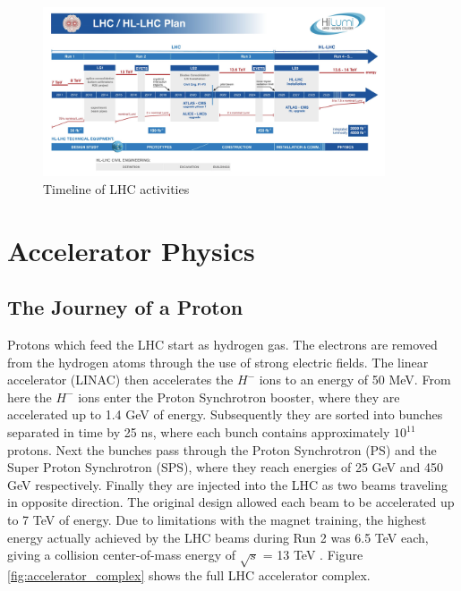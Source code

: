 \begin{figure}
        \centering
	\includegraphics[width=0.9\textwidth]{figures/ch2/hl_lhc_timeline.png}
	\caption{Timeline of LHC activities \cite{lhc_timeline}}
	\label{fig:lhc_timeline}
\end{figure}

 \section{Accelerator Physics}
 \subsection{The Journey of a Proton}
 Protons which feed the LHC start as hydrogen gas. The electrons are removed from the hydrogen atoms through the use of strong electric fields. The linear accelerator (LINAC) then accelerates the $H^-$ ions to an energy of 50 MeV. From here the $H^-$ ions enter the Proton Synchrotron booster, where they are accelerated up to 1.4 GeV of energy. Subsequently they are sorted into bunches separated in time by 25 ns,  where each bunch contains approximately $10^11$ protons. Next the bunches pass through the Proton Synchrotron (PS) and the Super Proton Synchrotron (SPS), where they reach energies of 25 GeV and 450 GeV respectively. Finally they are injected into the LHC as two beams traveling in opposite direction. The original design allowed each beam to be accelerated up to 7 TeV of energy. Due to limitations with the magnet training, the highest energy actually achieved by the LHC beams during Run 2 was 6.5 TeV each, giving a collision center-of-mass energy of $\sqrt{s}$ = 13 TeV \cite{lhc_faq}. Figure \ref{fig:accelerator_complex} shows the full LHC accelerator complex.\\

